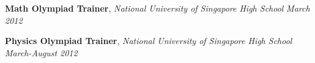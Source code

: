 \documentclass[9pt]{article}
\newenvironment{changemargin}[2]{%
  \begin{list}{}{%
      \setlength{\topsep}{0pt}%
      \setlength{\leftmargin}{#1}%
      \setlength{\rightmargin}{#2}%
      \setlength{\listparindent}{\parindent}%
      \setlength{\itemindent}{\parindent}%
      \setlength{\parsep}{\parskip}%
    }%
  \item[]}{\end{list}
}
\newenvironment{body} {
  \vspace*{-16pt}
  \begin{changemargin}{-0.25in}{-0.5in}
  }
  {\end{changemargin}
}
\begin{document}
\begin{body}
  \textbf{Math Olympiad Trainer}, \emph{National University of Singapore High School} \hfill \emph{March 2012}\\
  \smallskip

  \textbf{Physics Olympiad Trainer}, \emph{National University of Singapore High School} \hfill \emph{March-August 2012}\\
\end{body}
\smallskip
\end{document}
